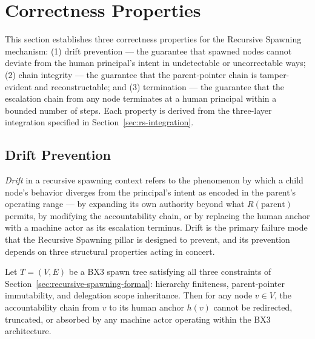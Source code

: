 \section{Correctness Properties}
\label{sec:rs-correctness}

This section establishes three correctness properties for the Recursive Spawning
mechanism: (1) drift prevention — the guarantee that spawned nodes cannot deviate
from the human principal's intent in undetectable or uncorrectable ways; (2) chain
integrity — the guarantee that the parent-pointer chain is tamper-evident and
reconstructable; and (3) termination — the guarantee that the escalation chain
from any node terminates at a human principal within a bounded number of steps.
Each property is derived from the three-layer integration specified in
Section~\ref{sec:rs-integration}.

\subsection{Drift Prevention}
\label{sec:rs-drift-prevention}

\textit{Drift} in a recursive spawning context refers to the phenomenon by which
a child node's behavior diverges from the principal's intent as encoded in the
parent's operating range — by expanding its own authority beyond what
$R(\text{parent})$ permits, by modifying the accountability chain, or by
replacing the human anchor with a machine actor as its escalation terminus.
Drift is the primary failure mode that the Recursive Spawning pillar is designed
to prevent, and its prevention depends on three structural properties acting in
concert.

\begin{theorem}
\label{th:drift-prevention}
Let $T = (V, E)$ be a BX3 spawn tree satisfying all three constraints of
Section~\ref{sec:recursive-spawning-formal}: hierarchy finiteness, parent-pointer
immutability, and delegation scope inheritance.  Then for any node $v \in V$,
the accountability chain from $v$ to its human anchor $h(v)$ cannot be redirected,
truncated, or absorbed by any machine actor operating within the BX3 architecture.
\end{theorem}

